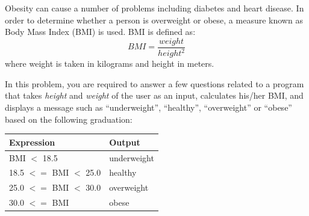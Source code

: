 \documentclass[11pt,a4paper,addpoints]{exam}
\begin{document}
\begin{questions}
    \question [5] Obesity can cause a number of problems including diabetes and heart disease. In order to determine whether a person is overweight or obese, a measure known as Body Mass Index (BMI) is used. BMI is defined as: \\
    \begin{equation*}
        BMI = \frac{weight}{height^2}
    \end{equation*}
    where weight is taken in kilograms and height in meters.

    \par
    In this problem, you are required to answer a few questions related to a program that takes \textit{height} and \textit{weight} of the user as an input, calculates his/her BMI, and displays a message such as ``underweight'', ``healthy'', ``overweight'' or ``obese'' based on the following graduation:
        \begin{table}[!htb]
        \centering
        \begin{tabular}{bb}
            \hline
            \rowcolor{Gray}
            \textbf{Expression} & \textbf{Output} \\
            \hline
            BMI $<$ 18.5 & underweight \\
            18.5 $<=$ BMI $<$ 25.0 & healthy \\
            25.0 $<=$ BMI $<$ 30.0 & overweight \\
            30.0 $<=$ BMI & obese \\ \hline
        \end{tabular}
        \end{table}
\end{questions}
\end{document}
